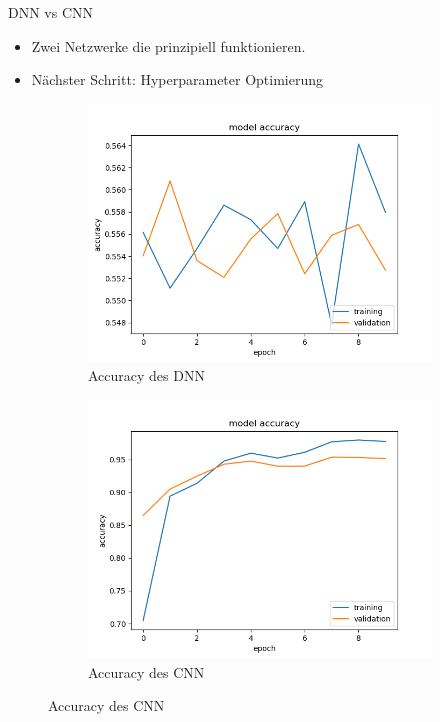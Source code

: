 \documentclass[aspectratio=1610, 9pt]{beamer}
\begin{document}
\begin{frame}{DNN vs CNN}
  \begin{itemize}
  \item Zwei Netzwerke die prinzipiell funktionieren.
  \item Nächster Schritt: Hyperparameter Optimierung
  \end{itemize}
  
  \begin{figure}
    \centering
    \begin{subfigure}{0.4\textwidth}
      \includegraphics[scale=0.35]{images/dnn_acc.png}
      \caption{Accuracy des DNN}
      \label{fig:dnn}
    \end{subfigure}
    \begin{subfigure}{0.4\textwidth}
      \includegraphics[scale=0.35]{images/cnn_acc.png}
      \caption{Accuracy des CNN}
      \label{fig:cnn}      
    \end{subfigure}
  \end{figure}

\end{frame}
\end{document}
